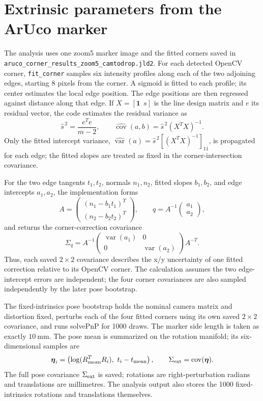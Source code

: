 \documentclass[11pt]{article}
\begin{document}
\FloatBarrier
\section{Extrinsic parameters from the ArUco marker}

The analysis uses one zoom5 marker image and the fitted corners saved in
\texttt{aruco\_corner\_results\_zoom5\_camtodrop.jld2}. For each detected
OpenCV corner, \texttt{fit\_corner} samples six intensity profiles along
each of the two adjoining edges, starting 8 pixels from the corner. A
sigmoid is fitted to each profile; its center estimates the local edge
position. The edge positions are then regressed against distance along that
edge. If \(X=[\boldsymbol{1}\ \ s]\) is the line design matrix and \(e\) its
residual vector, the code estimates the residual variance as
\[
  \hat{s}^{\,2} = \frac{e^T e}{m-2},
  \qquad
  \widehat{\operatorname{cov}}(a,b)
  = \hat{s}^{\,2}(X^TX)^{-1}.
\]
Only the fitted intercept variance,
\(\widehat{\operatorname{var}}(a)
=\hat{s}^{\,2}[(X^TX)^{-1}]_{11}\), is propagated for each edge; the fitted
slopes are treated as fixed in the corner-intersection covariance.

For the two edge tangents \(t_1,t_2\), normals \(n_1,n_2\), fitted slopes
\(b_1,b_2\), and edge intercepts \(a_1,a_2\), the implementation forms
\[
  A =
  \begin{pmatrix}
    (n_1-b_1t_1)^T\\
    (n_2-b_2t_2)^T
  \end{pmatrix},
  \qquad
  q=A^{-1}\begin{pmatrix}a_1\\a_2\end{pmatrix},
\]
and returns the corner-correction covariance
\[
  \Sigma_q
  = A^{-1}
    \begin{pmatrix}
      \operatorname{var}(a_1)&0\\
      0&\operatorname{var}(a_2)
    \end{pmatrix}
    A^{-T}.
\]
Thus, each saved \(2\times2\) covariance describes the x/y uncertainty of
one fitted correction relative to its OpenCV corner. The calculation
assumes the two edge-intercept errors are independent; the four corner
covariances are also sampled independently by the later pose bootstrap.

The fixed-intrinsics pose bootstrap holds the nominal camera matrix and
distortion fixed, perturbs each of the four fitted corners using its own
saved \(2\times2\) covariance, and runs solvePnP for 1000 draws. The marker
side length is taken as exactly \(\SI{10}{\milli\metre}\). The pose mean is
summarized on the rotation manifold; its six-dimensional samples are
\[
  \boldsymbol{\eta}_i =
  \left(
    \log(R_{\rm mean}^T R_i),\ t_i-t_{\rm mean}
  \right),
  \qquad
  \Sigma_{\rm ext}=\operatorname{cov}(\boldsymbol{\eta}).
\]
The full pose covariance \(\Sigma_{\rm ext}\) is saved; rotations are right-perturbation
radians and translations are millimetres. The analysis output also stores
the 1000 fixed-intrinsics rotations and translations themselves.
\end{document}
